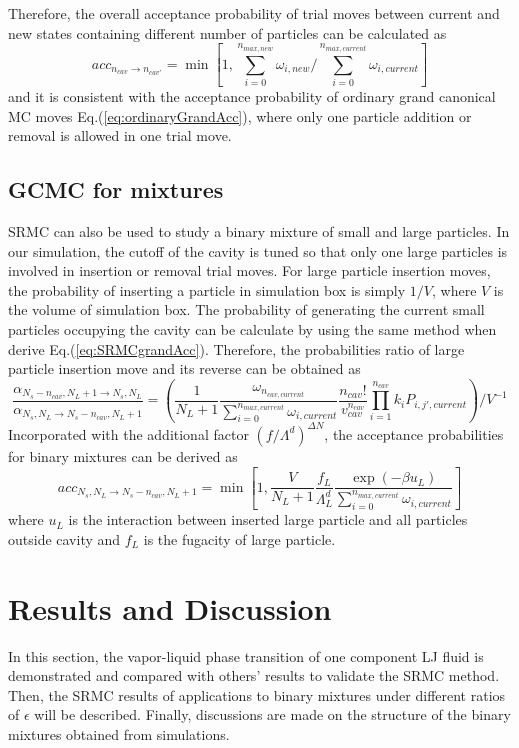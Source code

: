 \documentclass[aip,jcp,12pt]{revtex4-1}
\begin{document}
Therefore, the overall acceptance probability of trial moves between current and new states containing different number of particles can be calculated as 
\begin{equation}
\label{eq:SRMCgrandAcc}
acc_{n_{cav}\rightarrow n_{cav'}} = \min[1,{\sum\limits_{i=0}^{n_{max,new}} \omega_{i,new}} / {\sum\limits_{i=0}^{n_{max,current}} \omega_{i,current}}]
\end{equation}
and it is consistent with the acceptance probability of ordinary grand canonical MC moves Eq.(\ref{eq:ordinaryGrandAcc}), where only one particle addition or removal is allowed in one trial move. 

\subsection{GCMC for mixtures}
SRMC can also be used to study a binary mixture of small and large particles.  In our simulation, the cutoff of the cavity is tuned so that only one large particles is involved in insertion or removal trial moves. For large particle insertion moves, the probability of inserting a particle in simulation box is simply $1/V$, where $V$ is the volume of simulation box. The probability of generating the current small particles occupying  the cavity can be calculate by using the same method when derive Eq.(\ref{eq:SRMCgrandAcc}). Therefore, the probabilities ratio of large particle insertion move and its reverse can be obtained as 
\begin{equation}
\frac{\alpha_{N_s-n_{cav},N_L+1\rightarrow N_s,N_L}}{\alpha_{N_s,N_L\rightarrow N_s-n_{cav},N_L+1}} = (\frac{1}{N_L+1} \frac{\omega_{n_{cav,current}}}{\sum\limits_{i=0}^{n_{max,current}}\omega_{i,current}} \frac{n_{cav}!}{v_{cav}^{n_{cav}}}  \prod\limits_{i=1}^{n_{cav}} k_i P_{i,j',current})/V^{-1}
\end{equation}
Incorporated with the additional factor $(f/\Lambda^d)^{\Delta N}$, the acceptance probabilities for binary mixtures can be derived as
\begin{equation}
acc_{N_s,N_L\rightarrow N_s-n_{cav},N_L+1} = \min[1,\frac{V}{N_L+1} \frac{f_L}{\Lambda_L^d} \frac{\exp(-\beta u_L)}{\sum\limits_{i=0}^{n_{max,current}}\omega_{i,current}}]
\end{equation}
where $u_L$ is the interaction between inserted large particle and all particles outside cavity and $f_L$ is the fugacity of large particle.


\section{Results and Discussion}
In this section, the vapor-liquid phase transition of one component LJ fluid is demonstrated and compared with others' results to validate the SRMC method. Then, the SRMC results of applications to binary mixtures under different ratios of $\epsilon$ will be described. Finally, discussions are made on the structure of the binary mixtures obtained from simulations.
\end{document}

